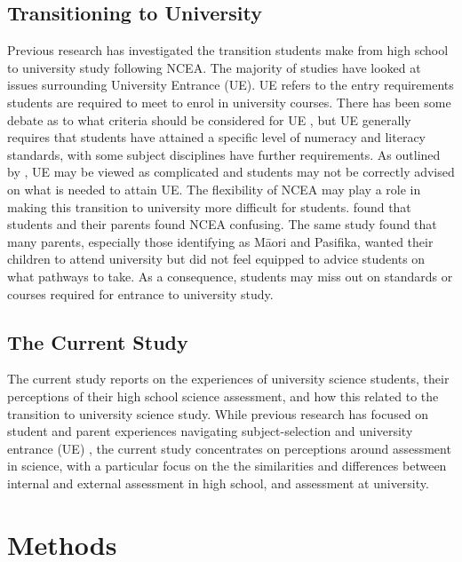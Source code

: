 \documentclass[a4paper,man,natbib]{apa6}
\begin{document}
\subsection{Transitioning to University}
Previous research has investigated the transition students make from high school to university study following NCEA. The majority of studies have looked at issues surrounding University Entrance (UE). UE refers to the entry requirements students are required to meet to enrol in university courses. There has been some debate as to what criteria should be considered for UE \citep{shulruf2015admission}, but UE generally requires that students have attained a specific level of numeracy and literacy standards, with some subject disciplines have further requirements. As outlined by \cite{vlaardingerbroek2006transition}, UE may be viewed as complicated and students may not be correctly advised on what is needed to attain UE. The flexibility of NCEA may play a role in making this transition to university more difficult for students. \cite{jensen2010ncea} found that students and their parents found NCEA confusing. The same study found that many parents, especially those identifying as M\={a}ori and Pasifika, wanted their children to attend university but did not feel equipped to advice students on what pathways to take. As a consequence, students may miss out on standards or courses required for entrance to university study. 

\subsection{The Current Study}
The current study reports on the experiences of university science students, their perceptions of their high school science assessment, and how this related to the transition to university science study. While previous research has focused on student and parent experiences navigating subject-selection and university entrance (UE) \citep{madjar2009towards, jensen2010ncea}, the current study concentrates on perceptions around assessment in science, with a particular focus on the the similarities and differences between internal and external assessment in high school, and assessment at university. 

\section{Methods}
\end{document}
